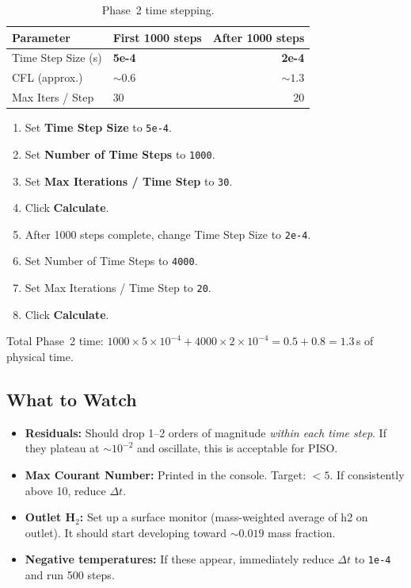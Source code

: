 \documentclass[12pt,a4paper]{report}
\begin{document}
\begin{table}[H]
\centering
\caption{Phase~2 time stepping.}
\begin{tabular}{@{}llr@{}}
\toprule
\textbf{Parameter} & \textbf{First 1000 steps} & \textbf{After 1000 steps} \\
\midrule
Time Step Size (s) & \textbf{5e-4}           & \textbf{2e-4} \\
CFL (approx.)      & $\sim 0.6$              & $\sim 1.3$ \\
Max Iters / Step   & 30                      & 20 \\
\bottomrule
\end{tabular}
\end{table}

\begin{enumerate}
  \item Set \textbf{Time Step Size} to \texttt{5e-4}.
  \item Set \textbf{Number of Time Steps} to \texttt{1000}.
  \item Set \textbf{Max Iterations / Time Step} to \texttt{30}.
  \item Click \textbf{Calculate}.
  \item After 1000 steps complete, change Time Step Size to
        \texttt{2e-4}.
  \item Set Number of Time Steps to \texttt{4000}.
  \item Set Max Iterations / Time Step to \texttt{20}.
  \item Click \textbf{Calculate}.
\end{enumerate}

\noindent Total Phase~2 time: $1000 \times 5\!\times\!10^{-4}
+ 4000 \times 2\!\times\!10^{-4} = 0.5 + 0.8 = 1.3$\,s of physical
time.

\subsection{What to Watch}

\begin{itemize}
  \item \textbf{Residuals:} Should drop 1--2 orders of magnitude
        \emph{within each time step}.  If they plateau at
        $\sim 10^{-2}$ and oscillate, this is acceptable for PISO.
  \item \textbf{Max Courant Number:} Printed in the console.
        Target: $< 5$.  If consistently above 10, reduce $\Delta t$.
  \item \textbf{Outlet H$_2$:} Set up a surface monitor (mass-weighted
        average of h2 on outlet).  It should start developing toward
        $\sim 0.019$ mass fraction.
  \item \textbf{Negative temperatures:} If these appear, immediately
        reduce $\Delta t$ to \texttt{1e-4} and run 500 steps.
\end{itemize}
\end{document}
